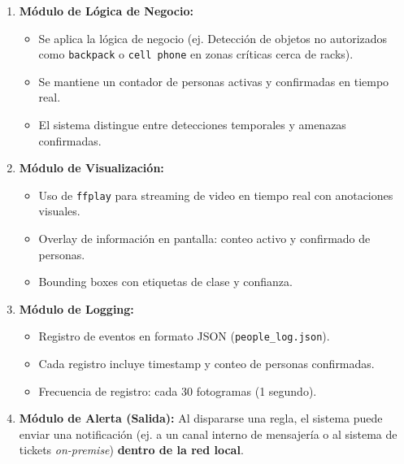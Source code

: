 \documentclass[12pt, a4paper]{article}
\begin{document}
\begin{enumerate}
\item \textbf{Módulo de Lógica de Negocio:}
\begin{itemize}
\item Se aplica la lógica de negocio (ej. Detección de objetos no autorizados como \texttt{backpack} o \texttt{cell phone} en zonas críticas cerca de racks).
\item Se mantiene un contador de personas activas y confirmadas en tiempo real.
\item El sistema distingue entre detecciones temporales y amenazas confirmadas.
\end{itemize}
\item \textbf{Módulo de Visualización:} 
\begin{itemize}
\item Uso de \texttt{ffplay} para streaming de video en tiempo real con anotaciones visuales.
\item Overlay de información en pantalla: conteo activo y confirmado de personas.
\item Bounding boxes con etiquetas de clase y confianza.
\end{itemize}
\item \textbf{Módulo de Logging:} 
\begin{itemize}
\item Registro de eventos en formato JSON (\texttt{people\_log.json}).
\item Cada registro incluye timestamp y conteo de personas confirmadas.
\item Frecuencia de registro: cada 30 fotogramas (1 segundo).
\end{itemize}
\item \textbf{Módulo de Alerta (Salida):} Al dispararse una regla, el sistema puede enviar una notificación (ej. a un canal interno de mensajería o al sistema de tickets \textit{on-premise}) \textbf{dentro de la red local}.
\end{enumerate}
\end{document}
